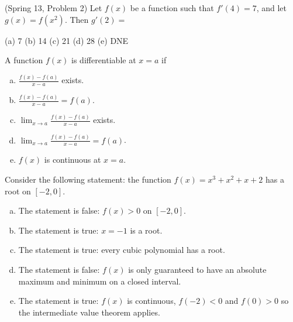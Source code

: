 \documentclass[12pt]{article}
\newcommand{\ds}{\displaystyle}
\newenvironment{problem}[2][Problem]{\begin{trivlist}
\item[\hskip \labelsep {\bfseries #1}\hskip \labelsep {\bfseries #2.}]}{\end{trivlist}}
\begin{document}
\newpage

\begin{problem}{34}
(Spring 13, Problem 2) Let $f(x)$ be a function such that $f'(4) = 7$, and let $g(x) = f(x^{2})$. Then $g'(2) = $
\begin{center}
  (a) 7 \qquad
  (b) 14 \qquad
  (c) 21 \qquad
  (d) 28 \qquad
  (e) DNE
\end{center}
\end{problem}

\vspace{.5in}

\begin{problem}{35}
A function $f(x)$ is differentiable at $x = a$ if
\begin{enumerate}[(a)]
  \item $\ds\frac{f(x) - f(a)}{x - a}$ exists. 
  \item $\ds\frac{f(x) - f(a)}{x - a} = f(a)$. 
  \item $\ds\lim_{x\rightarrow a} \frac{f(x) - f(a)}{x - a}$ exists. 
  \item $\ds\lim_{x\rightarrow a} \frac{f(x) - f(a)}{x - a} = f(a)$. 
  \item $f(x)$ is continuous at $x = a$. 
\end{enumerate}
\end{problem}

\vspace{.5in}

\begin{problem}{36}
Consider the following statement: the function $f(x) = x^{3} + x^{2} + x + 2$ has a root on $[-2,0]$. 
\begin{enumerate}[(a)]
  \item The statement is false: $f(x) > 0$ on $[-2,0]$. 
  \item The statement is true: $x = -1$ is a root. 
  \item The statement is true: every cubic polynomial has a root. 
  \item The statement is false: $f(x)$ is only guaranteed to have an absolute maximum and minimum on a closed interval. 
  \item The statement is true: $f(x)$ is continuous, $f(-2) < 0$ and $f(0) > 0$ so the intermediate value theorem applies. 
\end{enumerate}
\end{problem}

\newpage
\end{document}
